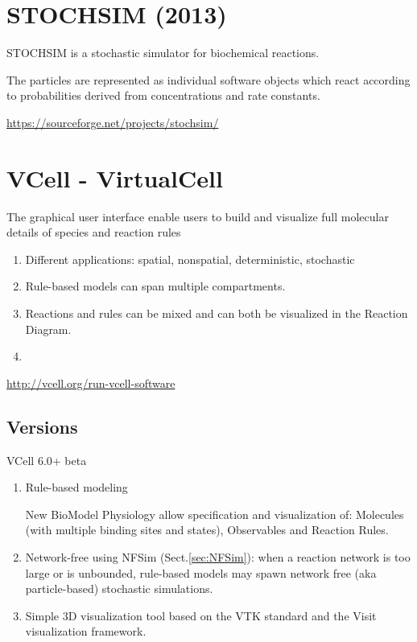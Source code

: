 \section{STOCHSIM (2013)}
\label{sec:STOCHSIM}

STOCHSIM is a stochastic simulator for biochemical reactions.

The particles are represented as individual software objects which react
according to probabilities derived from concentrations and rate constants.

\url{https://sourceforge.net/projects/stochsim/}

\section{VCell - VirtualCell}
\label{sec:VirtualCell}


The graphical user interface enable users to build and visualize full molecular
details of species and reaction rules
\begin{enumerate}
  
  \item Different applications: spatial, nonspatial, deterministic, stochastic
  
  \item  Rule-based models can span multiple compartments.
  
  
  \item Reactions and rules can be mixed and can both be visualized in the
  Reaction Diagram.
  
  \item  
\end{enumerate}


\url{http://vcell.org/run-vcell-software}

\subsection{Versions}

VCell 6.0+ beta
\begin{enumerate}
  \item  Rule-based modeling
  
New BioModel Physiology allow specification and visualization of: Molecules
(with multiple binding sites and states), Observables and Reaction Rules.

  \item Network-free using NFSim (Sect.\ref{sec:NFSim}): when a reaction network
  is too large or is unbounded, rule-based models may spawn network free (aka particle-based) stochastic simulations.
  
  \item Simple 3D visualization tool based on the VTK standard and the Visit
  visualization framework.

 
\end{enumerate}


